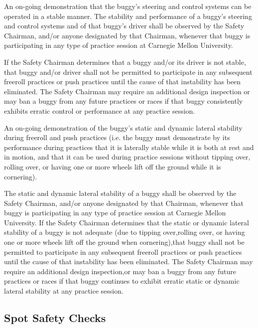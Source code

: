 \documentclass[openany]{book}
\begin{document}
An on-going demonstration that the buggy's steering and control systems can be operated in a stable manner. The stability and performance of a buggy's steering and control systems and of that buggy's driver shall be observed by the Safety Chairman, and/or anyone designated by that Chairman, whenever that buggy is participating in any type of practice session at Carnegie Mellon University.

If the Safety Chairman determines that a buggy and/or its driver is not stable, that buggy and/or driver shall not be permitted to participate in any subsequent freeroll practices or push practices until the cause of that instability has been eliminated. The Safety Chairman may require an additional design inspection or may ban a buggy from any future practices or races if that buggy consistently exhibits erratic control or performance at any practice session.

An on-going demonstration of the buggy's static and dynamic lateral stability during freeroll and push practices (i.e. the buggy must demonstrate by its performance during practices that it is laterally stable while it is both at rest and in motion, and that it can be used during practice sessions without tipping over, rolling over, or having one or more wheels lift off the ground while it is cornering).

The static and dynamic lateral stability of a buggy shall be observed by the Safety Chairman, and/or anyone designated by that Chairman, whenever that buggy is participating in any type of practice session at Carnegie Mellon University. If the Safety Chairman determines that the static or dynamic lateral stability of a buggy is not adequate (due to tipping over,rolling over, or having one or more wheels lift off the ground when cornering),that buggy shall not be permitted to participate in any subsequent freeroll practices or push practices until the cause of that instability has been eliminated. The Safety Chairman may require an additional design inspection,or may ban a buggy from any future practices or races if that buggy continues to exhibit erratic static or dynamic lateral stability at any practice session.

\subsection{Spot Safety Checks}
\end{document}
